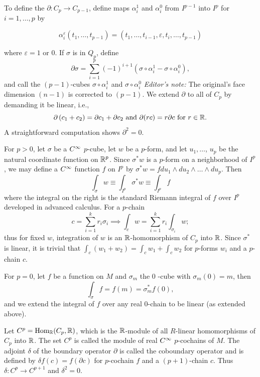 \documentclass[../main]{subfiles}
\begin{document}
To define the  $\partial: C_{p} \rightarrow C_{p-1}$, define maps $\alpha_{i}^{1}$ and $\alpha_{i}^{0}$ from $I^{p-1}$ into $I^{p}$ for $i=1, \ldots, p$ by

\begin{equation}\tag{16}\label{eq:ch07.16}
\alpha_{i}^{\varepsilon}\left(t_{1}, \ldots, t_{p-1}\right) =\left(t_{1}, \ldots, t_{i-1}, \varepsilon, t_{i}, \ldots, t_{p-1}\right)
\end{equation}

where $\varepsilon=1$ or $0$. If $\sigma$ is in $Q_{p}$, define \[\partial \sigma=\sum_{i=1}^{p}(-1)^{i+1}\left(\sigma \circ \alpha_{i}^{1}-\sigma \circ \alpha_{i}^{0}\right),\] and call the $(p-1)$-cubes $\sigma \circ \alpha_{i}^{1}$ and $\sigma \circ \alpha_{i}^{0}$  \emph{Editor's note:} The original's face dimension $(n-1)$ is corrected to $(p-1)$. We extend $\partial$ to all of $C_{p}$ by demanding it be linear, i.e., \[\partial\left(c_{1}+c_{2}\right)=\partial c_{1}+\partial c_{2}\text{ and }\partial(r c)=r \partial c \text{ for }r \in\mathbb{R}.\] A straightforward computation shows $\partial^{2}=0$.

For $p>0$, let $\sigma$ be a $C^\infty$ $p$-cube, let $w$ be a $p$-form, and let $u_{1}, \ldots$, $u_{p}$ be the natural coordinate function on $\mathbb{R}^{p}$. Since $\sigma^\ast w$ is a $p$-form on a neighborhood of $I^{p}$, we may define a $C^\infty$ function $f$ on $I^{p}$ by $\sigma^\ast w=f d u_{1} \wedge d u_{2} \wedge \ldots \wedge d u_{p}$. Then
\[\tag{17}\label{eq:ch07.17}
\int_{\sigma} w \equiv \int_{I^p} \sigma^\ast w \equiv \int_{I^p} f
\]
where the integral on the right is the standard Riemann integral of $f$ over $I^{p}$ developed in advanced calculus. For a $p$-chain \[c=\sum_{i=1}^{k} r_i\sigma_{i} \implies \int_{c} w=\sum_{i=1}^k r_i \int_{\sigma_{i}} w;\] thus for fixed $w$, integration of $w$ is an $\mathbb{R}$-homomorphism of $C_{p}$ into $\mathbb{R}$. Since $\sigma^\ast$ is linear, it is trivial that $\int_{c}\left(w_{1}+w_{2}\right)=\int_c w_{1}+\int_{c} w_{2}$ for $p$-forms $w_i$ and a $p$-chain $c$.

For $p=0$, let $f$ be a function on $M$ and $\sigma_{m}$ the 0 -cube with $\sigma_{m}(0)=m$, then \[\int_{\sigma} f=f(m)=\sigma_{m}^\ast f(0),\] and we extend the integral of $f$ over any real $0$-chain to be linear (as extended above).

Let $C^{p} = \mathrm{Hom}_{\mathbb{R}}(C_{p}, \mathbb{R})$, which is the $\mathbb{R}$-module of all $R$-linear homomorphisms of $C_{p}$ into $\mathbb{R}$. The set $C^{p}$ is called the module of real $C^\infty$ $p$-cochains of $M$. The adjoint $\delta$ of the boundary operator $\partial$ is called the coboundary operator and is defined by $\delta f(c)=f(\partial c)$ for $p$-cochain $f$ and a $(p+1)$-chain $c$. Thus $\delta: C^{p} \rightarrow C^{p+1}$ and $\delta^{2}=0$.
\end{document}
